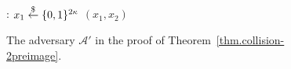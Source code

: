 \begin{figure}[t]
  \begin{algorithm}[H]
    \caption{\label{alg.collision-2preimage}
            The adversary $\mathcal{A}'$ in the
            proof of Theorem~\ref{thm.collision-2preimage}.}
    \begin{algorithmic}[1]
      :
          \State $x_1 \overset{\$}{\gets} \{0,1\}^{2\kappa}$
          \State \Return $(x_1, x_2)$
      \EndFunction
    \end{algorithmic}
  \end{algorithm}
\end{figure}
